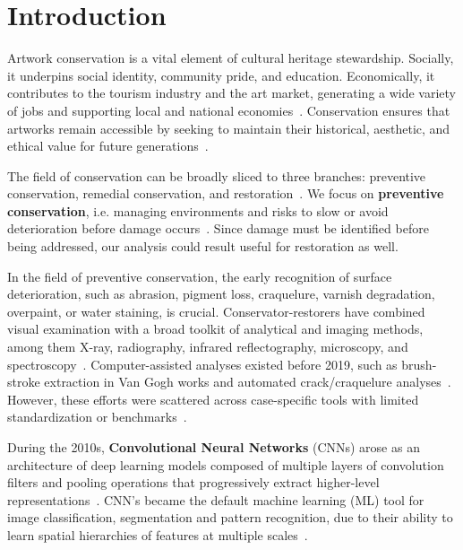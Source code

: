 \documentclass[conference]{IEEEtran}
\begin{document}
\section{Introduction}
\label{sec:Introduction}

Artwork conservation is a vital element of cultural heritage stewardship. Socially, it underpins social identity, community pride, and education. Economically, it contributes to the tourism industry and the art market, generating a wide variety of jobs and supporting local and national economies~\cite{ernst__young_global_limited_2014_creating_2014}. Conservation ensures that artworks remain accessible by seeking to maintain their historical, aesthetic, and ethical value for future generations~\cite{ernst__young_global_limited_2014_creating_2014}.

The field of conservation can be broadly sliced to three branches: preventive conservation, remedial conservation, and restoration~\cite{icom-cc_icom-cc_2009}. We focus on \textbf{preventive conservation}, i.e. managing environments and risks to slow or avoid deterioration before damage occurs~\cite{icom-cc_icom-cc_2009}. Since damage must be identified before being addressed, our analysis could result useful for restoration as well.

In the field of preventive conservation, the early recognition of surface deterioration, such as abrasion, pigment loss, craquelure, varnish degradation, overpaint, or water staining, is crucial. Conservator-restorers have combined visual examination with a broad toolkit of analytical and imaging methods, among them X-ray, radiography, infrared reflectography, microscopy, and spectroscopy~\cite{borg_application_2020}. Computer-assisted analyses existed before 2019, such as brush-stroke extraction in Van Gogh works and automated crack/craquelure analyses~\cite{borg_application_2020}. However, these efforts were scattered across case-specific tools with limited standardization or benchmarks~\cite{lamberti_computer-assisted_2014,sidorov_craquelure_2019,dulecha_crack_2019}.

During the 2010s, \textbf{Convolutional Neural Networks} (CNNs) arose as an architecture of deep learning models composed of multiple layers of convolution filters and pooling operations that progressively extract higher-level representations~\cite{mauricio_comparing_2023}. CNN's became the default machine learning (ML) tool for image classification, segmentation and pattern recognition, due to their ability to learn spatial hierarchies of features at multiple scales~\cite{yunusa_exploring_2024}.
\end{document}
